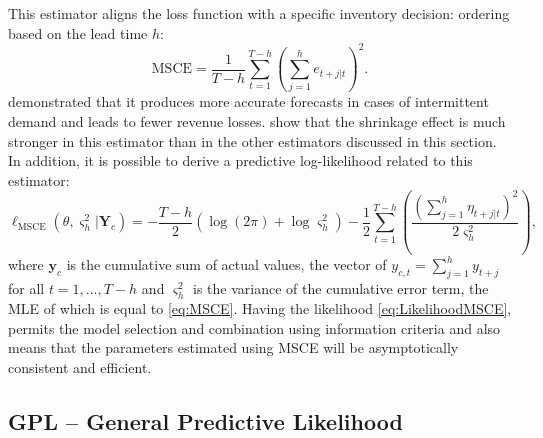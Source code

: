 \documentclass[
]{book}
\theoremstyle{definition}
\theoremstyle{definition}
\theoremstyle{definition}
\theoremstyle{definition}
\theoremstyle{remark}
\begin{document}
This estimator aligns the loss function with a specific inventory decision: ordering based on the lead time \(h\):
\begin{equation}
    \mathrm{MSCE} = \frac{1}{T-h} \sum_{t=1}^{T-h} \left( \sum_{j=1}^h e_{t+j|t} \right)^2 .
  \label{eq:MSCE}
\end{equation}
\citet{kourentzes2019unconstraining} demonstrated that it produces more accurate forecasts in cases of intermittent demand and leads to fewer revenue losses. \citet{Svetunkov2020Multistep} show that the shrinkage effect is much stronger in this estimator than in the other estimators discussed in this section. In addition, it is possible to derive a predictive log-likelihood related to this estimator:
\begin{equation}
    \ell_{\mathrm{MSCE}}(\theta, {\varsigma^2_h} | \mathbf{Y}_c) = -\frac{T-h}{2} \left( \log(2 \pi) + \log {\varsigma^2_h} \right) -\frac{1}{2} \sum_{t=1}^{T-h} \left( \frac{\left(\sum_{j=1}^h \eta_{t+j|t}\right)^2}{2 {\varsigma^2_h}} \right) ,
  \label{eq:LikelihoodMSCE}
\end{equation}
where \(\mathbf{y}_c\) is the cumulative sum of actual values, the vector of \(y_{c,t}=\sum_{j=1}^h y_{t+j}\) for all \(t=1, \ldots, T-h\) and \({\varsigma^2_h}\) is the variance of the cumulative error term, the MLE of which is equal to \eqref{eq:MSCE}. Having the likelihood \eqref{eq:LikelihoodMSCE}, permits the model selection and combination using information criteria \citep[Section 13.4][]{SvetunkovSBA} and also means that the parameters estimated using MSCE will be asymptotically consistent and efficient.

\hypertarget{gpl-general-predictive-likelihood}{%
\subsection{GPL -- General Predictive Likelihood}\label{gpl-general-predictive-likelihood}}
\end{document}
